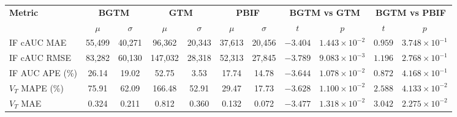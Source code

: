 \begin{sidewaystable}[b]
	\centering
	\small
	\setlength{\tabcolsep}{10pt}
	\begin{tabular}{l|cc|cc|cc|cc|cc}
		\toprule
		\multirow{2}{*}{\textbf{Metric}} & \multicolumn{2}{c|}{\textbf{BGTM}} & \multicolumn{2}{c|}{\textbf{GTM}} & \multicolumn{2}{c|}{\textbf{PBIF}} & \multicolumn{2}{c|}{\textbf{BGTM vs GTM}} & \multicolumn{2}{c}{\textbf{BGTM vs PBIF}}                                                                                                  \\
		\cmidrule(lr){2-3} \cmidrule(lr){4-5} \cmidrule(lr){6-7} \cmidrule(lr){8-9} \cmidrule(lr){10-11}
		                                 & \(\mu\)                            & \(\sigma\)                        & \(\mu\)                            & \(\sigma\)                                & \(\mu\)                                   & \(\sigma\) & \(t\)      & \(p\)                          & \(t\)      & \(p\)                  \\
		\midrule
		IF cAUC MAE                      & 55{,}499                           & 40{,}271                          & 96{,}362                           & 20{,}343                                  & 37{,}613                                  & 20{,}456   & \(-3.404\) & \(1.443\times10^{-2}\)\sym{*}  & \(0.959\)  & \(3.748\times10^{-1}\) \\
		IF cAUC RMSE                     & 83{,}282                           & 60{,}130                          & 147{,}032                          & 28{,}318                                  & 52{,}313                                  & 27{,}845   & \(-3.789\) & \(9.083\times10^{-3}\)\sym{**} & \(1.196\)  & \(2.768\times10^{-1}\) \\
		IF AUC APE (\%)                  & 26.14                              & 19.02                             & 52.75                              & 3.53                                      & 17.74                                     & 14.78      & \(-3.644\) & \(1.078\times10^{-2}\)\sym{*}  & \(0.872\)  & \(4.168\times10^{-1}\) \\
		\midrule
		\(V_T\) MAPE (\%)                & 75.91                              & 62.09                             & 166.48                             & 52.91                                     & 29.47                                     & 17.73      & \(-3.628\) & \(1.100\times10^{-2}\)\sym{*}  & \(2.588\)  & \(4.133\times10^{-2}\) \\
		\(V_T\) MAE                      & 0.324                              & 0.211                             & 0.812                              & 0.360                                     & 0.132                                     & 0.072      & \(-3.477\) & \(1.318\times10^{-2}\)\sym{*}  & \(3.042\)  & \(2.275\times10^{-2}\) \\

\end{tabular}
\end{sidewaystable}
